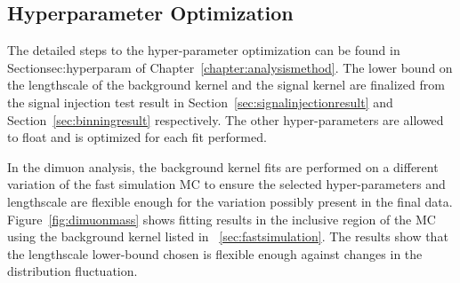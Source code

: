 \subsection{Hyperparameter Optimization}
The detailed steps to the hyper-parameter optimization can be found in Section{sec:hyperparam} of Chapter~\ref{chapter:analysismethod}.
The lower bound on the lengthscale of the background kernel and the signal kernel are finalized from the signal injection test result in Section~\ref{sec:signalinjectionresult} and Section~\ref{sec:binningresult} respectively. The other hyper-parameters are allowed to float and is optimized for each fit performed. 

In the dimuon analysis, the background kernel fits are performed on a different variation of the fast simulation MC to ensure the selected hyper-parameters and lengthscale are flexible enough for the variation possibly present in the final data. Figure~\ref{fig:dimuonmass} shows fitting results in the inclusive region of the MC using the background kernel listed in ~\ref{sec:fastsimulation}. The results show that the lengthscale lower-bound chosen is flexible enough against changes in the distribution fluctuation. 


